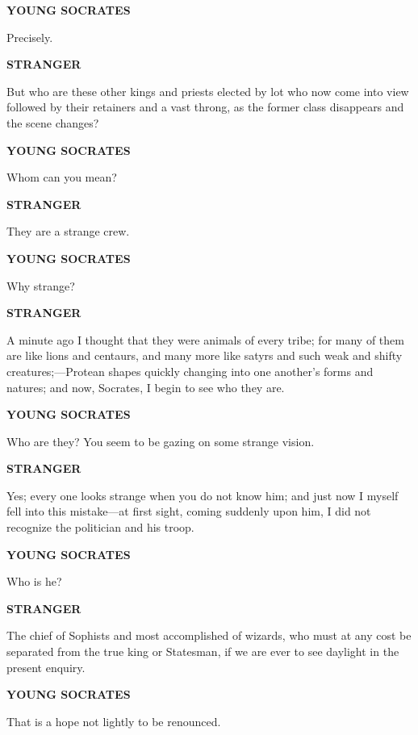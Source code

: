 \documentclass[11pt,letter]{article}
\begin{document}
\par \textbf{YOUNG SOCRATES}
\par   Precisely.

\par \textbf{STRANGER}
\par   But who are these other kings and priests elected by lot who now come into view followed by their retainers and a vast throng, as the former class disappears and the scene changes?

\par \textbf{YOUNG SOCRATES}
\par   Whom can you mean?

\par \textbf{STRANGER}
\par   They are a strange crew.

\par \textbf{YOUNG SOCRATES}
\par   Why strange?

\par \textbf{STRANGER}
\par   A minute ago I thought that they were animals of every tribe; for many of them are like lions and centaurs, and many more like satyrs and such weak and shifty creatures;—Protean shapes quickly changing into one another's forms and natures; and now, Socrates, I begin to see who they are.

\par \textbf{YOUNG SOCRATES}
\par   Who are they? You seem to be gazing on some strange vision.

\par \textbf{STRANGER}
\par   Yes; every one looks strange when you do not know him; and just now I myself fell into this mistake—at first sight, coming suddenly upon him, I did not recognize the politician and his troop.

\par \textbf{YOUNG SOCRATES}
\par   Who is he?

\par \textbf{STRANGER}
\par   The chief of Sophists and most accomplished of wizards, who must at any cost be separated from the true king or Statesman, if we are ever to see daylight in the present enquiry.

\par \textbf{YOUNG SOCRATES}
\par   That is a hope not lightly to be renounced.
\end{document}
